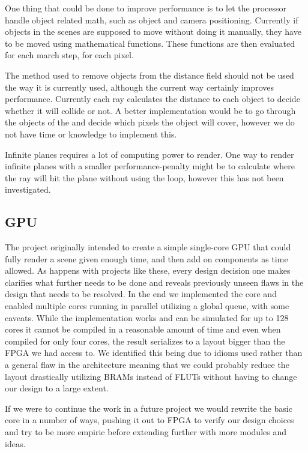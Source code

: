 			One thing that could be done to improve performance is to let the
			processor handle object related math, such as object and camera 
			positioning. Currently if objects in the scenes are supposed to 
			move without doing it manually, they have to be moved using 
			mathematical functions. These functions are then evaluated for 
			each march step, for each pixel.

			The method used to remove objects from the distance field should
			not be used the way it is currently used, although the current way
			certainly improves performance. Currently each ray calculates the
			distance to each object to decide whether it will collide or not. 
			A better implementation would be to go through the objects of the 
			and decide which pixels the object will cover, however we do not
			have time or knowledge to implement this. 

			Infinite planes requires a lot of computing power to render. One 
			way to render infinite planes with a smaller performance-penalty 
			might be to calculate where the ray will hit the plane without 
			using the loop, however this has not been investigated. 


		
		\subsection{GPU} 
		
			The project originally intended to create a simple single-core GPU that
			could fully render a scene given enough time, and then add on components
			as time allowed. As happens with projects like these, every design
			decision one makes clarifies what further needs to be done and reveals
			previously unseen flaws in the design that needs to be resolved. In the
			end we implemented the core and enabled multiple cores running in
			parallel utilizing a global queue, with some caveats. While the
			implementation works and can be simulated for up to 128 cores it cannot
			be compiled in a reasonable amount of time and even when compiled for
			only four cores, the result serializes to a layout bigger than the FPGA
			we had access to. We identified this being due to idioms used rather than
			a general flaw in the architecture meaning that we could probably reduce
			the layout drastically utilizing BRAMs instead of FLUTs without having to
			change our design to a large extent. 
			
			If we were to continue the work in a
			future project we would rewrite the basic core in a number of ways,
			pushing it out to FPGA to verify our design choices and try to be more
			empiric before extending further with more modules and ideas. 
